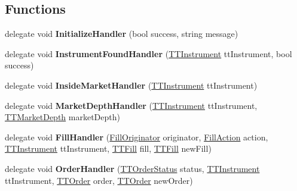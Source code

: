 \subsection*{Functions}
\begin{DoxyCompactItemize}
\item 
\hypertarget{namespace_e_z_a_p_i_ab5703ccfe825844eba82f428bc724251}{delegate void {\bfseries Initialize\-Handler} (bool success, string message)}\label{namespace_e_z_a_p_i_ab5703ccfe825844eba82f428bc724251}

\item 
\hypertarget{namespace_e_z_a_p_i_a3f9886f2637135635b544d3ac5cf0c76}{delegate void {\bfseries Instrument\-Found\-Handler} (\hyperlink{class_e_z_a_p_i_1_1_containers_1_1_t_t_instrument}{T\-T\-Instrument} tt\-Instrument, bool success)}\label{namespace_e_z_a_p_i_a3f9886f2637135635b544d3ac5cf0c76}

\item 
\hypertarget{namespace_e_z_a_p_i_ac5323afdd34bb5010fb09cd7caee1086}{delegate void {\bfseries Inside\-Market\-Handler} (\hyperlink{class_e_z_a_p_i_1_1_containers_1_1_t_t_instrument}{T\-T\-Instrument} tt\-Instrument)}\label{namespace_e_z_a_p_i_ac5323afdd34bb5010fb09cd7caee1086}

\item 
\hypertarget{namespace_e_z_a_p_i_a988355cc15874187fd7698567e7f86aa}{delegate void {\bfseries Market\-Depth\-Handler} (\hyperlink{class_e_z_a_p_i_1_1_containers_1_1_t_t_instrument}{T\-T\-Instrument} tt\-Instrument, \hyperlink{class_e_z_a_p_i_1_1_containers_1_1_t_t_market_depth}{T\-T\-Market\-Depth} market\-Depth)}\label{namespace_e_z_a_p_i_a988355cc15874187fd7698567e7f86aa}

\item 
\hypertarget{namespace_e_z_a_p_i_ac98a61e2d4ddc7aa3afad41ec817419c}{delegate void {\bfseries Fill\-Handler} (\hyperlink{namespace_e_z_a_p_i_1_1_containers_ac4a10657ec0024847b9518e0ad75e16e}{Fill\-Originator} originator, \hyperlink{namespace_e_z_a_p_i_1_1_containers_ac44efd9b58d9e3746dcc24b165d19169}{Fill\-Action} action, \hyperlink{class_e_z_a_p_i_1_1_containers_1_1_t_t_instrument}{T\-T\-Instrument} tt\-Instrument, \hyperlink{class_e_z_a_p_i_1_1_containers_1_1_t_t_fill}{T\-T\-Fill} fill, \hyperlink{class_e_z_a_p_i_1_1_containers_1_1_t_t_fill}{T\-T\-Fill} new\-Fill)}\label{namespace_e_z_a_p_i_ac98a61e2d4ddc7aa3afad41ec817419c}

\item 
\hypertarget{namespace_e_z_a_p_i_a2228b474c7387756934d39783f61f2d2}{delegate void {\bfseries Order\-Handler} (\hyperlink{namespace_e_z_a_p_i_1_1_containers_a195b281517d19ae193243894635d7547}{T\-T\-Order\-Status} status, \hyperlink{class_e_z_a_p_i_1_1_containers_1_1_t_t_instrument}{T\-T\-Instrument} tt\-Instrument, \hyperlink{class_e_z_a_p_i_1_1_containers_1_1_t_t_order}{T\-T\-Order} order, \hyperlink{class_e_z_a_p_i_1_1_containers_1_1_t_t_order}{T\-T\-Order} new\-Order)}\label{namespace_e_z_a_p_i_a2228b474c7387756934d39783f61f2d2}


\end{DoxyCompactItemize}
